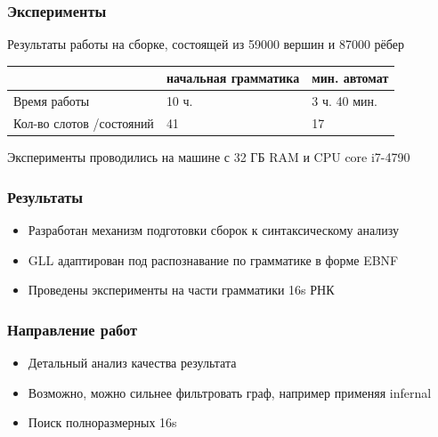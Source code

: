 \documentclass{beamer}
\begin{document}
\begin{frame}
    \frametitle{Эксперименты}
    Результаты работы на сборке, состоящей из 59000 вершин и 87000 рёбер
    \begin{center}
        \begin{tabular}{ p{2.5cm} | p{2cm} | p{2.5cm}}
                                        & начальная грамматика & мин. автомат \\ \hline
            Время работы                & 10 ч.                & 3 ч. 40 мин. \\ \hline
            Кол-во слотов /состояний    & 41                   & 17           \\ \hline
        \end{tabular}
    \end{center}
    Эксперименты проводились на машине с 32 ГБ RAM и CPU core i7-4790
    
\end{frame}

\begin{frame}
    \frametitle{Результаты}
    \begin{itemize}
        \item Разработан механизм подготовки сборок к синтаксическому анализу
        \item GLL адаптирован под распознавание по грамматике в форме EBNF
        \item Проведены эксперименты на части грамматики 16s РНК
    \end{itemize}
\end{frame}

\begin{frame}
    \frametitle{Направление работ}
    \begin{itemize}
        \item Детальный анализ качества результата
        \item Возможно, можно сильнее фильтровать граф, например применяя infernal 
        \item Поиск полноразмерных 16s
    \end{itemize}
\end{frame}
\end{document}
